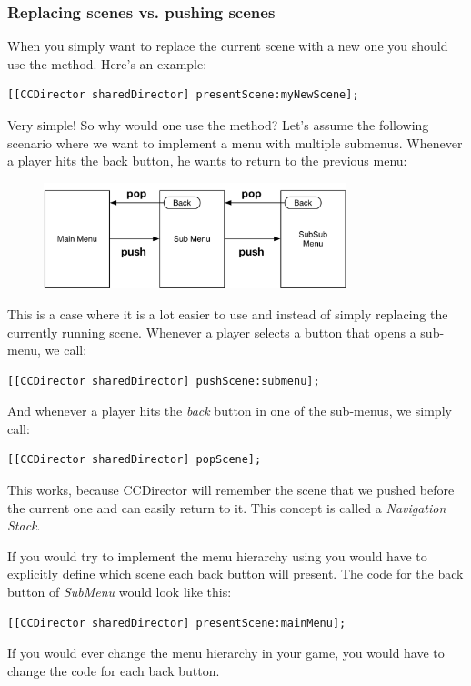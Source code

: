 \subsubsection{Replacing scenes vs. pushing scenes}
When you simply want to replace the current scene with a new one you should use
the  method. Here's an example:
\begin{lstlisting}
[[CCDirector sharedDirector] presentScene:myNewScene];
\end{lstlisting}
Very simple! So why would one use the  method?
Let's assume the following scenario where we want to implement a menu with
multiple submenus. Whenever a player hits the back button, he wants to return
to the previous menu:
\begin{figure}[H]
		\centering
		\includegraphics[width=250pt]{images/firstproject/navigation_stack.png}
\end{figure}
This is a case where it is a lot easier to use  and
 instead of simply replacing the currently running scene.
Whenever a player selects a button that opens a sub-menu, we call:
\begin{lstlisting}
[[CCDirector sharedDirector] pushScene:submenu];
\end{lstlisting}
And whenever a player hits the \textit{back} button in one of the sub-menus, we
simply call:
\begin{lstlisting}
[[CCDirector sharedDirector] popScene];
\end{lstlisting}
This works, because CCDirector will remember the scene that we pushed before the
current one and can easily return to it. This concept is called a
\textit{Navigation Stack}.

If you would try to implement the menu hierarchy using
 you would have to explicitly define which scene each
back button will present. The code for the back button of \textit{SubMenu}
would look like this:
\begin{lstlisting}
[[CCDirector sharedDirector] presentScene:mainMenu];
\end{lstlisting}
If you would ever change the menu hierarchy in your game, you would have to
change the code for each back button.

